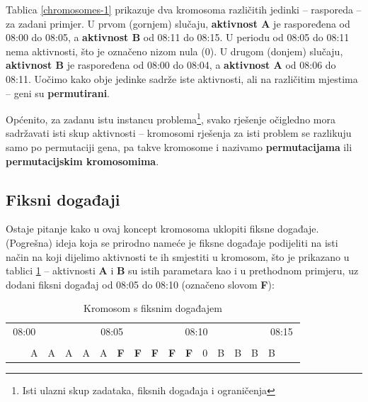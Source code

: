 \documentclass[times, utf8, zavrsni]{fer}
\begin{document}
Tablica \ref{chromosomes-1} prikazuje dva kromosoma različitih jedinki -- rasporeda -- za zadani primjer. U prvom (gornjem) slučaju, \textbf{aktivnost A} je raspoređena od 08:00 do 08:05, a \textbf{aktivnost B} od 08:11 do 08:15. U periodu od 08:05 do 08:11 nema aktivnosti, što je označeno nizom nula ($0$). U drugom (donjem) slučaju, \textbf{aktivnost B} je raspoređena od 08:00 do 08:04, a \textbf{aktivnost A} od 08:06 do 08:11. Uočimo kako obje jedinke sadrže iste aktivnosti, ali na različitim mjestima -- geni su \textbf{permutirani}.

Općenito, za zadanu istu instancu problema\footnote{Isti ulazni skup zadataka,  fiksnih događaja i ograničenja}, svako rješenje očigledno mora sadržavati isti skup aktivnosti -- kromosomi rješenja za isti problem se razlikuju samo po permutaciji gena, pa takve kromosome i nazivamo \textbf{permutacijama} ili \textbf{permutacijskim kromosomima}.

\subsection{Fiksni događaji}\label{fiksni dogadaji}
Ostaje pitanje kako u ovaj koncept kromosoma uklopiti fiksne događaje. (Pogrešna) ideja koja se prirodno nameće je fiksne događaje podijeliti na isti način na koji dijelimo aktivnosti te ih smjestiti u kromosom, što je prikazano u tablici \ref{chromosome-fiksni-1} -- aktivnosti \textbf{A} i \textbf{B} su istih parametara kao i u prethodnom primjeru, uz dodani fiksni događaj od 08:05 do 08:10 (označeno slovom \textbf{F}):

\begin{table}[!htbp]
\centering
\caption{Kromosom s fiksnim događajem}
\label{chromosome-fiksni-1}
\begin{tabular}{lllllcllllclllllcll}
\multicolumn{3}{c}{08:00} &  &  & \multicolumn{4}{c}{08:05} &  & \multicolumn{4}{c}{08:10} &  &  & \multicolumn{3}{c}{08:15} \\
 & \multicolumn{1}{l|}{} &  &  &  & \multicolumn{1}{l}{} & \multicolumn{1}{l|}{} &  &  &  & \multicolumn{1}{l}{} & \multicolumn{1}{l|}{} &  &  &  &  & \multicolumn{1}{l|}{} &  &  \\ \cline{3-17}
 & \multicolumn{1}{l|}{} & \multicolumn{1}{c|}{A} & \multicolumn{1}{c|}{A} & \multicolumn{1}{c|}{A} & \multicolumn{1}{c|}{A} & \multicolumn{1}{c|}{A} & \multicolumn{1}{c|}{\textbf{F}} & \multicolumn{1}{c|}{\textbf{F}} & \multicolumn{1}{c|}{\textbf{F}} & \multicolumn{1}{c|}{\textbf{F}} & \multicolumn{1}{c|}{\textbf{F}} & \multicolumn{1}{c|}{0} & \multicolumn{1}{c|}{B} & \multicolumn{1}{c|}{B} & \multicolumn{1}{c|}{B} & \multicolumn{1}{c|}{B} &  &  \\ \cline{3-17}
\end{tabular}
\end{table}
\end{document}

